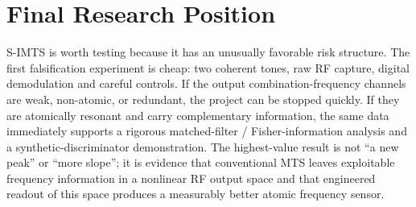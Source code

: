 \documentclass[10pt]{article}
\begin{document}
\normalsize
\section*{Final Research Position}
S-IMTS is worth testing because it has an unusually favorable risk structure. The first falsification experiment is cheap: two coherent tones, raw RF capture, digital demodulation and careful controls. If the output combination-frequency channels are weak, non-atomic, or redundant, the project can be stopped quickly. If they are atomically resonant and carry complementary information, the same data immediately supports a rigorous matched-filter / Fisher-information analysis and a synthetic-discriminator demonstration. The highest-value result is not ``a new peak'' or ``more slope''; it is evidence that conventional MTS leaves exploitable frequency information in a nonlinear RF output space and that engineered readout of this space produces a measurably better atomic frequency sensor.
\end{document}
